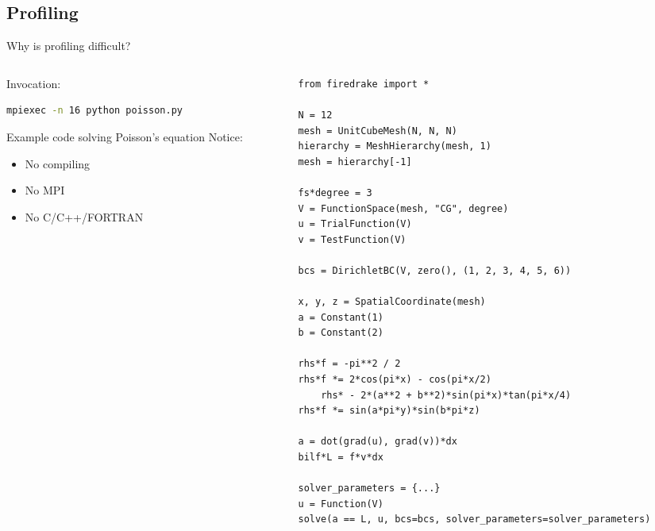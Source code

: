 \documentclass[pdf,aspectratio=169]{beamer}
\begin{document}
\subsection{Profiling}
\begin{frame}[fragile]{Why is profiling difficult?}
\begin{columns}[T]
\begin{column}[T]{0.45\textwidth}
Invocation:
\begin{lstlisting}[language={bash}]
mpiexec -n 16 python poisson.py
\end{lstlisting}

Example code solving Poisson's equation
Notice:
\begin{itemize}
	\item No compiling
	\item No MPI
	\item No C/C++/FORTRAN
\end{itemize}
\end{column}
\begin{column}[T]{0.45\textwidth}
\vspace{-3em}
\begin{lstlisting}[language={[highlighting]python}]
from firedrake import *

N = 12
mesh = UnitCubeMesh(N, N, N)
hierarchy = MeshHierarchy(mesh, 1)
mesh = hierarchy[-1]

fs*degree = 3
V = FunctionSpace(mesh, "CG", degree)
u = TrialFunction(V)
v = TestFunction(V)

bcs = DirichletBC(V, zero(), (1, 2, 3, 4, 5, 6))

x, y, z = SpatialCoordinate(mesh)
a = Constant(1)
b = Constant(2)

rhs*f = -pi**2 / 2
rhs*f *= 2*cos(pi*x) - cos(pi*x/2)
    rhs* - 2*(a**2 + b**2)*sin(pi*x)*tan(pi*x/4)
rhs*f *= sin(a*pi*y)*sin(b*pi*z)

a = dot(grad(u), grad(v))*dx
bilf*L = f*v*dx

solver_parameters = {...}
u = Function(V)
solve(a == L, u, bcs=bcs, solver_parameters=solver_parameters)
\end{lstlisting}
\end{column}
\end{columns}
\end{frame}
\end{document}
